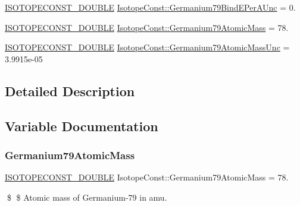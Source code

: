 \begin{DoxyCompactItemize}
\mbox{\hyperlink{group___isotope_const-_macros_ga8f45a7272ce02c0b4c65c44636ed719a}{I\+S\+O\+T\+O\+P\+E\+C\+O\+N\+S\+T\+\_\+\+D\+O\+U\+B\+LE}} \mbox{\hyperlink{group___isotope_const-_germanium-_ge79_ga2fd2b244e4cee665963d2a628d6c236e}{Isotope\+Const\+::\+Germanium79\+Bind\+E\+Per\+A\+Unc}} = 0.
\item 
\mbox{\hyperlink{group___isotope_const-_macros_ga8f45a7272ce02c0b4c65c44636ed719a}{I\+S\+O\+T\+O\+P\+E\+C\+O\+N\+S\+T\+\_\+\+D\+O\+U\+B\+LE}} \mbox{\hyperlink{group___isotope_const-_germanium-_ge79_ga6e53c2e3ee70abcdfb5e992ad8949ffd}{Isotope\+Const\+::\+Germanium79\+Atomic\+Mass}} = 78.
\item 
\mbox{\hyperlink{group___isotope_const-_macros_ga8f45a7272ce02c0b4c65c44636ed719a}{I\+S\+O\+T\+O\+P\+E\+C\+O\+N\+S\+T\+\_\+\+D\+O\+U\+B\+LE}} \mbox{\hyperlink{group___isotope_const-_germanium-_ge79_ga6f48975ee2569176140a145bc8838d71}{Isotope\+Const\+::\+Germanium79\+Atomic\+Mass\+Unc}} = 3.\+9915e-\/05
\end{DoxyCompactItemize}


\subsection{Detailed Description}


\subsection{Variable Documentation}
\mbox{\label{group___isotope_const-_germanium-_ge79_ga6e53c2e3ee70abcdfb5e992ad8949ffd}} 
\subsubsection{\texorpdfstring{Germanium79\+Atomic\+Mass}{Germanium79AtomicMass}}
{\footnotesize\ttfamily \mbox{\hyperlink{group___isotope_const-_macros_ga8f45a7272ce02c0b4c65c44636ed719a}{I\+S\+O\+T\+O\+P\+E\+C\+O\+N\+S\+T\+\_\+\+D\+O\+U\+B\+LE}} Isotope\+Const\+::\+Germanium79\+Atomic\+Mass = 78.}

\$ \$ Atomic mass of Germanium-\/79 in amu. \mbox{\label{group___isotope_const-_germanium-_ge79_ga6f48975ee2569176140a145bc8838d71}} 
